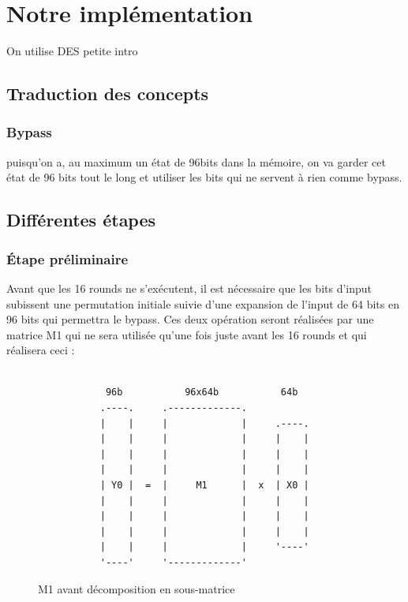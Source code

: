 \documentclass[a4paper,12pt]{article}
\begin{document}
\newpage

\section{Notre implémentation}

On utilise DES
petite intro

\subsection{Traduction des concepts}

\subsubsection{Bypass}

puisqu'on a, au maximum un état de 96bits dans la mémoire, on va garder cet état de 96 bits tout le long et utiliser les bits qui ne servent à rien comme bypass.

\subsection{Différentes étapes}

\subsubsection{Étape préliminaire}

Avant que les 16 rounds ne s'exécutent, il est nécessaire que les bits d'input subissent une permutation initiale suivie d'une expansion de l'input de 64 bits en 96 bits qui permettra le bypass.
Ces deux opération seront réalisées par une matrice M1 qui ne sera utilisée qu'une fois juste avant les 16 rounds et qui réalisera ceci :

\begin{figure}[h]
\begin{verbatim}

            96b           96x64b           64b
           .----.     .-------------. 
           |    |     |             |     .----.
           |    |     |             |     |    |
           |    |     |             |     |    |
           |    |     |             |     |    |
           | Y0 |  =  |     M1      |  x  | X0 |
           |    |     |             |     |    |
           |    |     |             |     |    |
           |    |     |             |     |    |
           |    |     |             |     '----'
           '----'     '-------------'

\end{verbatim}
\caption{M1 avant décomposition en sous-matrice}
\label{fig:ascii-box}
\end{figure}
\end{document}

